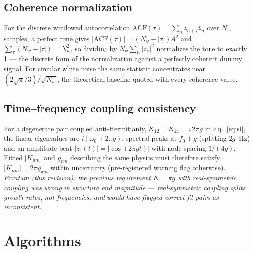 \documentclass[10pt,letterpaper]{article}
\begin{document}
\subsection{Coherence normalization}
For the discrete windowed autocorrelation
$\mathrm{ACF}(\tau) = \sum_n z_{n+\tau}\bar z_n$ over $N_w$ samples, a
perfect tone gives $|\mathrm{ACF}(\tau)| = (N_w - |\tau|) A^2$ and
$\sum_\tau (N_w - |\tau|) = N_w^2$, so dividing by
$N_w \sum_n |z_n|^2$ normalizes the tone to exactly 1 — the discrete form
of the \citet{koster2026} normalization against a perfectly coherent
dummy signal. For circular white noise the same statistic concentrates
near $(2\sqrt{\pi}/3)/\sqrt{N_w}$, the theoretical baseline quoted with
every coherence value.

\subsection{Time--frequency coupling consistency}
For a degenerate pair coupled anti-Hermitianly,
$K_{12} = K_{21} = i\,2\pi g$ in Eq.~\eqref{eq:sl}, the linear
eigenvalues are $i(\omega_0 \pm 2\pi g)$: spectral peaks at
$f_0 \pm g$ (splitting $2g$~Hz) and an amplitude beat
$|z_1(t)| = |\!\cos(2\pi g t)|$ with node spacing $1/(4g)$. Fitted
$|K_{nm}|$ and $g_{nm}$ describing the same physics must therefore
satisfy $|K_{nm}| = 2\pi g_{nm}$ within uncertainty (pre-registered
warning flag otherwise). \emph{Erratum (this revision): the previous
requirement $K = \pi g$ with real-symmetric coupling was wrong in
structure and magnitude — real-symmetric coupling splits growth rates,
not frequencies, and would have flagged correct fit pairs as
inconsistent.}

\section{Algorithms}\label{app:algorithms}
\end{document}
